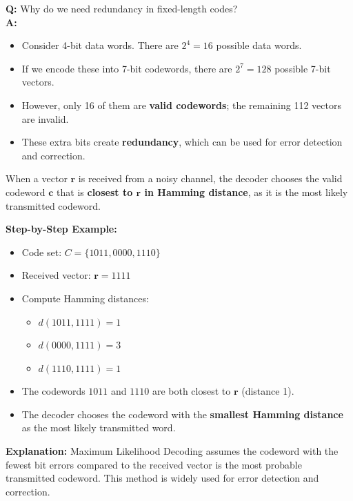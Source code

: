 \documentclass[11pt,a4paper]{book}
\newenvironment{definitionbox}[1][Definition]{
    \begin{tcolorbox}[
        enhanced,
        breakable,
        colback=primaryblue!10,
        colframe=primaryblue!150,
        title=#1,
        fonttitle=\bfseries,
        sharp corners,
        boxrule=0.8pt,
        left=8pt,
        right=8pt,
        top=6pt,
        bottom=6pt
    ]
}{
    \end{tcolorbox}
}
\newenvironment{infobox}[1][Information]{
    \begin{tcolorbox}[
        enhanced,
        breakable,
        colback=mintgreen!10,
        colframe=mintgreen!200,
        title=#1,
        fonttitle=\bfseries,
        sharp corners,
        boxrule=0.8pt,
        left=8pt,
        right=8pt,
        top=6pt,
        bottom=6pt
    ]
}{
    \end{tcolorbox}
}
\newcounter{qna}[chapter]
\renewcommand{\theqna}{\thechapter.\arabic{qna}}
\newenvironment{questionanswerbox}{
    \refstepcounter{qna}%
    \begin{tcolorbox}[
        enhanced,
        breakable,
        colback=softlavender!10,
        colframe=softlavender!200,
        title={Example~\theqna}, %
        fonttitle=\bfseries,
        coltitle=white,
        colbacktitle=softlavender!200,
        sharp corners,
        boxrule=1pt,
        left=8pt,
        right=8pt,
        top=6pt,
        bottom=6pt
    ]
}{
    \end{tcolorbox}
}
\begin{document}
\begin{questionanswerbox}
    \textbf{Q:} Why do we need redundancy in fixed-length codes? \\
    \textbf{A:}
    \begin{itemize}
        \item Consider 4-bit data words. There are $2^4 = 16$ possible data words.
        \item If we encode these into 7-bit codewords, there are $2^7 = 128$ possible 7-bit vectors.
        \item However, only 16 of them are \textbf{valid codewords}; the remaining 112 vectors are invalid.
        \item These extra bits create \textbf{redundancy}, which can be used for error detection and correction.
    \end{itemize}
\end{questionanswerbox}

\begin{definitionbox}[Maximum Likelihood Decoding]
        When a vector $\mathbf{r}$ is received from a noisy channel, the decoder chooses the valid codeword $\mathbf{c}$ that is \textbf{closest to $\mathbf{r}$ in Hamming distance}, as it is the most likely transmitted codeword.
    \end{definitionbox}
    
\begin{infobox}[Maximum Likelihood Decoding]

    \textbf{Step-by-Step Example:}
    \begin{itemize}
        \item Code set: $C = \{1011, 0000, 1110\}$
        \item Received vector: $\mathbf{r} = 1111$
        \item Compute Hamming distances:
              \begin{itemize}
                  \item $d(1011, 1111) = 1$
                  \item $d(0000, 1111) = 3$
                  \item $d(1110, 1111) = 1$
              \end{itemize}
        \item The codewords $1011$ and $1110$ are both closest to $\mathbf{r}$ (distance 1).
        \item The decoder chooses the codeword with the \textbf{smallest Hamming distance} as the most likely transmitted word.
    \end{itemize}

    \textbf{Explanation:}
    Maximum Likelihood Decoding assumes the codeword with the fewest bit errors compared to the received vector is the most probable transmitted codeword. This method is widely used for error detection and correction.
\end{infobox}
\end{document}
